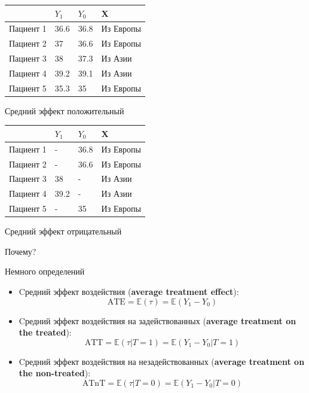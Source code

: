 \begin{frame}{}



\begin{table}[]
\begin{tabular}{l|l|l||l}
&$Y_1$ & $Y_0$ & X \\
\hline
Пациент 1 & 36.6 & 36.8 & Из Европы \\
Пациент 2 & 37   & 36.6 & Из Европы \\
Пациент 3 &38   & 37.3 &  Из Азии \\
Пациент 4 &39.2 & 39.1 &  Из Азии \\
Пациент 5 &35.3 & 35  &  Из Европы
\end{tabular}
\end{table}

Средний эффект положительный

\begin{table}[]
\begin{tabular}{l|l|l||l}
&$Y_1$ & $Y_0$ & X \\
\hline
Пациент 1 & - & 36.8 & Из Европы \\
Пациент 2 & - & 36.6 & Из Европы  \\
Пациент 3 &38   & - &  Из Азии \\
Пациент 4 &39.2 & - & Из Азии  \\
Пациент 5 & - & 35 & Из Европы
\end{tabular}
\end{table}

Средний эффект отрицательный

Почему?
    
\end{frame}



\begin{frame}{Немного определений}

\begin{itemize}
    \item Cредний эффект воздействия (\textbf{average treatment effect}):
$$
\text{ATE} = \mathbb{E}(\tau) =  \mathbb{E}(Y_1 - Y_0)
$$

\item Cредний эффект воздействия на задействованных (\textbf{average treatment on the treated}):
$$
\text{ATT} = \mathbb{E}(\tau|T=1) = \mathbb{E}(Y_1 - Y_0|T=1)
$$
\item Cредний эффект воздействия на незадействованных (\textbf{average treatment on the non-treated}):
$$
\text{ATnT} = \mathbb{E}(\tau|T=0) =  \mathbb{E}(Y_1 - Y_0|T=0)
$$
\end{itemize} 
    
\end{frame}

